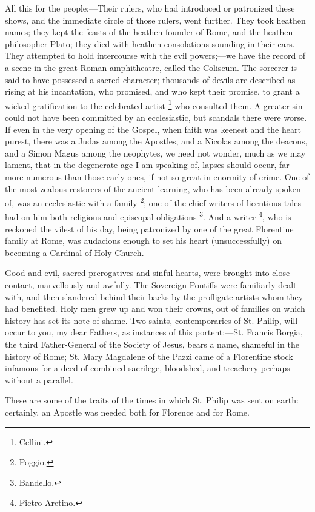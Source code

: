 All this for the people:—Their rulers, who had
introduced or patronized these shows, and the immediate
circle of those rulers, went further. They took heathen
names; they kept the feasts of the heathen founder of
Rome, and the heathen philosopher Plato; they died with
heathen consolations sounding in their ears. They
attempted to hold intercourse with the evil
powers;—we have the record of a scene in the great
Roman amphitheatre, called the Coliseum. The sorcerer is
said to have possessed a sacred character; thousands of
devils are described as rising at his incantation, who
promised, and who kept their promise, to grant a wicked
gratification to the celebrated artist \footnote{Cellini.} who consulted them. A greater
sin could not have been committed by an ecclesiastic, but
scandals there were worse. If even in the very opening of
the Gospel, when faith was keenest and the heart purest,
there was a Judas among the Apostles, and a Nicolas among
the deacons, and a Simon Magus among the neophytes, we
need not wonder, much as we may lament, that in the
degenerate age I am speaking of, lapses should occur, far
more numerous than those early ones, if not so great in
enormity of crime. One of the most zealous restorers of
the ancient learning, who has been already spoken of, was
an ecclesiastic with a family \footnote{Poggio.}; one of the chief writers of
licentious tales had on him both religious and episcopal
obligations \footnote{Bandello.}. And a writer \footnote{Pietro Aretino.}, who is reckoned the vilest
of his day, being patronized by one of the great
Florentine family at Rome, was audacious enough to set
his heart (unsuccessfully) on becoming a Cardinal of Holy
Church.

Good and evil, sacred prerogatives and sinful hearts,
were brought into close contact, marvellously and
awfully. The Sovereign Pontiffs were familiarly dealt
with, and then slandered behind their backs by the
profligate artists whom they had benefited. Holy men grew
up and won their crowns, out of families on which history
has set its note of shame. Two saints, contemporaries of
St. Philip, will occur to you, my dear Fathers, as
instances of this portent:—St. Francis Borgia, the
third Father-General of the Society of Jesus, bears a
name, shameful in the history of Rome; St. Mary Magdalene
of the Pazzi came of a Florentine stock infamous for a
deed of combined sacrilege, bloodshed, and treachery
perhaps without a parallel.

These are some of the traits of the times in which St.
Philip was sent on earth: certainly, an Apostle was
needed both for Florence and for Rome.

